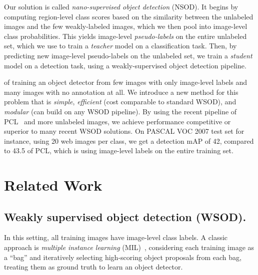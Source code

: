 \documentclass[review]{elsarticle}
\begin{document}

Our  solution is called \emph{nano-supervised object detection} (NSOD).
It begins by computing region-level class scores based on the similarity 
between the unlabeled images and 
{the few weakly-labeled images}, which we then pool into image-level class probabilities.
{This yields image-level \emph{pseudo-labels} on the entire unlabeled set, which we use to train a \emph{teacher} model on a classification task.}
Then, by predicting new image-level  pseudo-labels on the unlabeled set, we train a \emph{student} model on a detection task, using a weakly-supervised object detection pipeline.


 of training
an object detector from few 
images with only image-level labels and many images with no annotation at all. We introduce a new method for this problem that is \emph{simple}, \emph{efficient} (cost comparable to standard WSOD), and \emph{modular} (can build on any WSOD pipeline). By using the recent pipeline of PCL~\cite{tang2018pami} and more unlabeled images, we achieve performance competitive or superior to many recent WSOD solutions.
{On PASCAL VOC 2007 test set for instance, using 20 web images per class,
we get a detection mAP of 42, compared to 43.5 of PCL, which is using image-level labels on the entire training set.
}


 \section{Related Work}
\label{sec:related}



\subsection{Weakly supervised object detection (WSOD).}
In this setting, all training images have image-level class labels. A classic approach is 
\emph{multiple instance learning} (MIL)~\cite{andrews2003nips}, considering each training image as a ``bag'' and iteratively selecting {high-scoring object proposals}
from each bag, treating them as ground truth to learn an object detector. 
\end{document}
